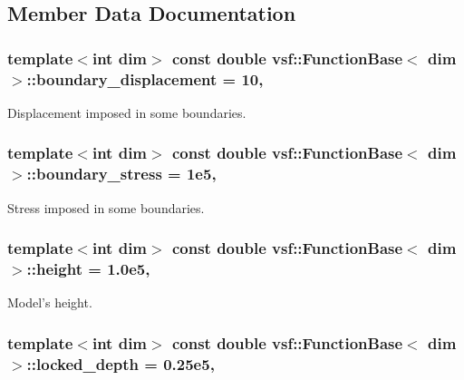 \subsection{Member Data Documentation}
\hypertarget{classvsf_1_1FunctionBase_a70a9a9f8a1a73386e582c529338f2d5e}{
\subsubsection[{boundary\-\_\-displacement}]{\setlength{\rightskip}{0pt plus 5cm}template$<$int dim$>$ const double {\bf vsf\-::\-Function\-Base}$<$ dim $>$\-::boundary\-\_\-displacement = 10\hspace{0.3cm}{\ttfamily [static]}, {\ttfamily [protected]}}}\label{classvsf_1_1FunctionBase_a70a9a9f8a1a73386e582c529338f2d5e}
Displacement imposed in some boundaries. \hypertarget{classvsf_1_1FunctionBase_a342cfaf03d11de71ca34234f48e8825e}{
\subsubsection[{boundary\-\_\-stress}]{\setlength{\rightskip}{0pt plus 5cm}template$<$int dim$>$ const double {\bf vsf\-::\-Function\-Base}$<$ dim $>$\-::boundary\-\_\-stress = 1e5\hspace{0.3cm}{\ttfamily [static]}, {\ttfamily [protected]}}}\label{classvsf_1_1FunctionBase_a342cfaf03d11de71ca34234f48e8825e}
Stress imposed in some boundaries. \hypertarget{classvsf_1_1FunctionBase_acfffb54eadb79217d150a73e3797b25a}{
\subsubsection[{height}]{\setlength{\rightskip}{0pt plus 5cm}template$<$int dim$>$ const double {\bf vsf\-::\-Function\-Base}$<$ dim $>$\-::height = 1.\-0e5\hspace{0.3cm}{\ttfamily [static]}, {\ttfamily [protected]}}}\label{classvsf_1_1FunctionBase_acfffb54eadb79217d150a73e3797b25a}
Model's height. \hypertarget{classvsf_1_1FunctionBase_ae06ffa81ca26e9ead535d50596d852c1}{
\subsubsection[{locked\-\_\-depth}]{\setlength{\rightskip}{0pt plus 5cm}template$<$int dim$>$ const double {\bf vsf\-::\-Function\-Base}$<$ dim $>$\-::locked\-\_\-depth = 0.\-25e5\hspace{0.3cm}{\ttfamily [static]}, {\ttfamily [protected]}}}\label{classvsf_1_1FunctionBase_ae06ffa81ca26e9ead535d50596d852c1}
